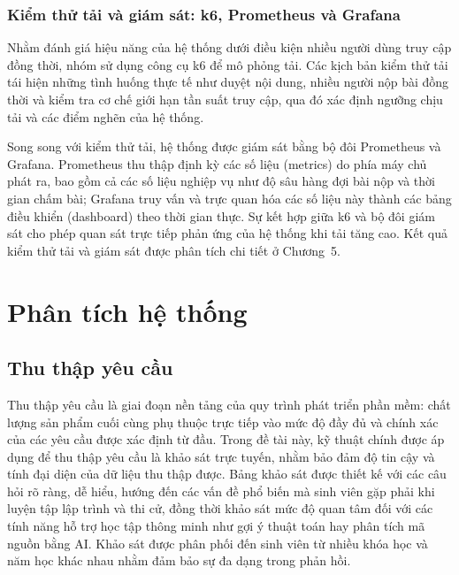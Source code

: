 \documentclass[12pt, a4paper]{report}
\begin{document}
\subsection{Kiểm thử tải và giám sát: k6, Prometheus và Grafana}

Nhằm đánh giá hiệu năng của hệ thống dưới điều kiện nhiều người dùng truy cập đồng thời,
nhóm sử dụng công cụ k6 để mô phỏng tải. Các kịch bản kiểm thử tải tái hiện những
tình huống thực tế như duyệt nội dung, nhiều người nộp bài đồng thời và kiểm tra cơ chế giới hạn tần
suất truy cập, qua đó xác định ngưỡng chịu tải và các điểm nghẽn của hệ thống.

Song song với kiểm thử tải, hệ thống được giám sát bằng bộ đôi Prometheus và Grafana.
Prometheus thu thập định kỳ các số liệu (metrics) do phía máy chủ phát ra, bao gồm cả các
số liệu nghiệp vụ như độ sâu hàng đợi bài nộp và thời gian chấm bài; Grafana truy
vấn và trực quan hóa các số liệu này thành các bảng điều khiển (dashboard) theo thời gian
thực. Sự kết hợp giữa k6 và bộ đôi giám sát cho phép quan sát trực tiếp phản ứng của hệ thống
khi tải tăng cao. Kết quả kiểm thử tải và giám sát được phân tích chi tiết ở Chương~5.

\chapter{Phân tích hệ thống}

\section{Thu thập yêu cầu}

Thu thập yêu cầu là giai đoạn nền tảng của quy trình phát triển phần mềm: chất lượng sản
phẩm cuối cùng phụ thuộc trực tiếp vào mức độ đầy đủ và chính xác của các yêu cầu được xác
định từ đầu. Trong đề tài này, kỹ thuật chính được áp dụng để thu thập yêu cầu là khảo
sát trực tuyến, nhằm bảo đảm độ tin cậy và tính đại diện của dữ liệu thu thập được. Bảng khảo sát được thiết kế với các câu hỏi rõ ràng, dễ hiểu, hướng
đến các vấn đề phổ biến mà sinh viên gặp phải khi luyện tập lập trình và thi cử, đồng thời
khảo sát mức độ quan tâm đối với các tính năng hỗ trợ học tập thông minh như gợi ý thuật
toán hay phân tích mã nguồn bằng \ac{AI}. Khảo sát được phân phối đến sinh viên từ nhiều
khóa học và năm học khác nhau nhằm đảm bảo sự đa dạng trong phản hồi.
\end{document}

